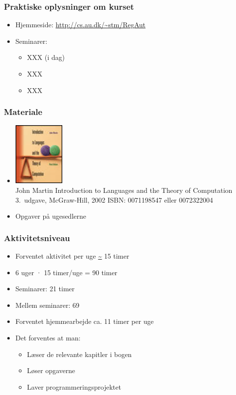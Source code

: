 \documentclass[]{beamer}
\begin{document}
\begin{frame}
\frametitle{Praktiske oplysninger om kurset}
\begin{itemize}
\item Hjemmeside: \url{http://cs.au.dk/~stm/RegAut}
\item Seminarer: %
\begin{itemize}
\item XXX (i dag)
\item XXX
\item XXX
\end{itemize}

\end{itemize}
\end{frame}

\begin{frame}
\frametitle{Materiale}
\begin{itemize}
\item 
\includegraphics[width=0.2\textwidth]{images/1_seminar_bog}\\
John Martin
Introduction to Languages and 
the Theory of Computation
3. udgave, McGraw-Hill, 2002
ISBN: 0071198547 eller 0072322004
\item Opgaver på ugesedlerne
\end{itemize}
\end{frame}

\begin{frame}
\frametitle{Aktivitetsniveau}
\begin{itemize}
\item Forventet aktivitet per uge \url{~} 15 timer
\item 6 uger · 15 timer/uge = 90 timer
\item Seminarer: 21 timer
\item Mellem seminarer: 69
\item Forventet hjemmearbejde ca. 11 timer per uge
\item Det forventes at man:
\begin{itemize}
\item Læser de relevante kapitler i bogen
\item Løser opgaverne
\item Laver programmeringsprojektet
\end{itemize}
\end{itemize}
\end{frame}
\end{document}
